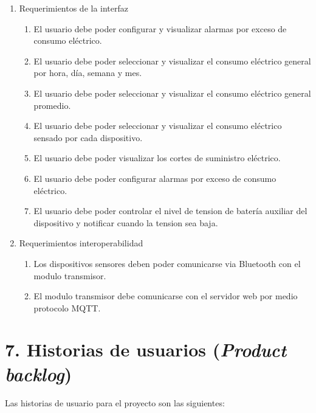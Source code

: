 \documentclass[
11pt, %
]{charter}
\begin{document}
\begin{enumerate}
\begin{enumerate}
		\end{enumerate}
	\item Requerimientos de la interfaz
		\begin{enumerate}
			\item El usuario debe poder configurar y visualizar alarmas por exceso de consumo eléctrico.
			\item El usuario debe poder seleccionar y visualizar el consumo eléctrico general por hora, día, semana y mes.
			\item El usuario debe poder seleccionar y visualizar el consumo eléctrico general promedio.
			\item El usuario debe poder seleccionar y visualizar el consumo eléctrico sensado por cada dispositivo.
			\item El usuario debe poder visualizar los cortes de suministro eléctrico.
			\item El usuario debe poder configurar alarmas por exceso de consumo eléctrico.	
			\item El usuario debe poder controlar el nivel de tension de batería auxiliar del dispositivo y notificar cuando la tension sea baja. 
		\end{enumerate}
	
	\item Requerimientos interoperabilidad
	\begin{enumerate}
		\item Los dispositivos sensores deben poder comunicarse via Bluetooth con el modulo transmisor.
		\item El modulo transmisor debe comunicarse con el servidor web por medio protocolo MQTT.
	\end{enumerate}
	
\end{enumerate}



\section{7. Historias de usuarios (\textit{Product backlog})}
\label{sec:backlog}

Las historias de usuario para el proyecto son las siguientes:
\end{document}
